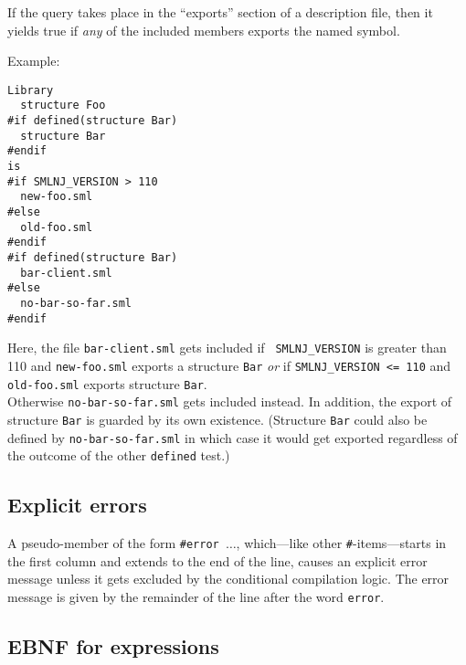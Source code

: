 \documentclass{article}
\begin{document}
If the query takes place in the ``exports'' section of a description
file, then it yields true if {\em any} of the included members exports
the named symbol.

\noindent Example:

\begin{verbatim}
Library
  structure Foo
#if defined(structure Bar)
  structure Bar
#endif
is
#if SMLNJ_VERSION > 110
  new-foo.sml
#else
  old-foo.sml
#endif
#if defined(structure Bar)
  bar-client.sml
#else
  no-bar-so-far.sml
#endif
\end{verbatim}

Here, the file {\tt bar-client.sml} gets included if {\tt
SMLNJ\_VERSION} is greater than 110 and {\tt new-foo.sml} exports a
structure {\tt Bar} {\em or} if {\tt SMLNJ\_VERSION <= 110} and {\tt
old-foo.sml} exports structure {\tt Bar}. \\
Otherwise {\tt no-bar-so-far.sml} gets included instead.  In addition,
the export of structure {\tt Bar} is guarded by its own existence.
(Structure {\tt Bar} could also be defined by {\tt no-bar-so-far.sml}
in which case it would get exported regardless of the outcome of the
other {\tt defined} test.)

\subsection{Explicit errors}

A pseudo-member of the form {\tt \#error $\ldots$}, which---like other
{\tt \#}-items---starts in the first column and extends to the end of
the line, causes an explicit error message unless it gets excluded by
the conditional compilation logic.  The error message is given by the
remainder of the line after the word {\tt error}.

\subsection{EBNF for expressions}
\end{document}

